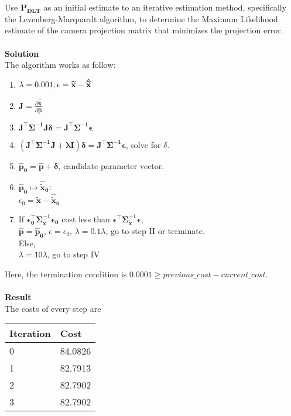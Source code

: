 \documentclass{../../assignment}
\begin{document}
\begin{problemlist}
\begin{enumerate}
Use $\mathbf{P_{DLT}}$ as an initial estimate to an iterative estimation method, specifically the Levenberg-Marquardt algorithm, to determine the Maximum Likelihood estimate of the camera projection matrix that minimizes the projection error.
\\\\
\textbf{Solution}\\
The algorithm works as follow:
\begin{enumerate}[I]
\item $\lambda = 0.001;\\
\epsilon = \mathbf{\widetilde x} - \mathbf{\hat{\widetilde x}}$
\\
\item $\mathbf{J} = \frac{\partial \mathbf{\hat{\widetilde x}}}{\partial \mathbf{\hat{p}}}$
\\
\item $\mathbf{J^{\top} \Sigma^{-1} J \delta = J^{\top} \Sigma^{-1} \epsilon}$
\\
\item $\mathbf{(J^{\top} \Sigma^{-1} J + \lambda I)\delta = J^{\top} \Sigma^{-1} \epsilon}$, solve for $\delta$.
\\
\item $\mathbf{\hat{p}_0 = \hat{p} + \delta}$, candidate parameter vector.
\\
\item $\mathbf{\hat{p}_0 \mapsto \hat{\widetilde x}_0}$;\\
$\epsilon_0 = \mathbf{\widetilde x} - \mathbf{\hat{\widetilde x}_0}$
\\
\item 
If $\mathbf{\epsilon_0^{\top} \Sigma_{\widetilde x}^{-1} \epsilon_0}$ cost less than $\mathbf{\epsilon^{\top} \Sigma_{\widetilde x}^{-1} \epsilon}$,\\
$\mathbf{\hat{p} = \hat{p}_0}$, $\epsilon = \epsilon_0$, $\lambda = 0.1\lambda$, go to step II or terminate.
\\
Else,\\
$\lambda = 10\lambda$, go to step IV\\
\end{enumerate}
Here, the termination condition is $0.0001 \geqslant previous\_cost - current\_cost$.
\\\\
\textbf{Result}\\
The costs of every step are
\begin{center}  
\begin{tabular}{|l|l|}
\hline
Iteration&Cost\\
\hline
0&84.0826\\
\hline 
1&82.7913\\
\hline 
2&82.7902\\
\hline 
3&82.7902\\
\hline 
\end{tabular}
\end{center}


\end{enumerate}
\end{problemlist}
\end{document}
